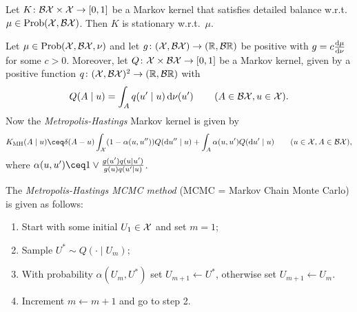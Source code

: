 \begin{lemma}
	Let $K \colon \mathcal B \mathcal X \times \mathcal X \to [0, 1]$ be a Markov kernel that satisfies detailed balance w.r.t.\ $\mu \in \operatorname{Prob}(\mathcal X, \mathcal B\mathcal X)$. Then $K$ is stationary w.r.t.\ $\mu$. 
\end{lemma}

\begin{definition}
	Let $\mu \in \operatorname{Prob}(\mathcal X, \mathcal B\mathcal X, \nu)$ and let $g \colon (\mathcal X, \mathcal B\mathcal X) \to (\mathbb R, \mathcal B\mathbb R)$ be positive with $g = c \dv{\mu}{\nu}$ for some $c > 0$. Moreover, let $Q \colon \mathcal X \times \mathcal B\mathcal X \to [0, 1]$ be a Markov kernel, given by a positive function $q \colon (\mathcal X, \mathcal B\mathcal X)^2 \to (\mathbb R, \mathcal B\mathbb R)$ with
	\[
	Q(A \mid u) = \int_A q(u' \mid u) \dd{\nu(u')} \qquad(A \in \mathcal B\mathcal X, u \in \mathcal X). 
	\]
	Now the \emph{Metropolis-Hastings} Markov kernel is given by
	\[
	K_\Rm{MH}(A \mid u) \ceq \delta(A - u) \int_\XX (1-\alpha(u, u'')) Q(\dd{u''} \mid u) + \int_A \alpha(u, u') Q(\dd{u'} \mid u) \qquad(u \in \XX, A \in \BB\XX),
	\]
	where $\alpha(u, u') \ceq 1 \lor \frac{g(u') q(u \mid u')}{g(u) q(u' \mid u)}$. 
\end{definition}

The \emph{Metropolis-Hastings MCMC method} (MCMC = Markov Chain Monte Carlo) is given as follows:
\begin{enumerate}
	\item Start with some initial $U_1 \in \mathcal X$ and set $m = 1$;
	\item Sample $U^* \sim Q(\cdot \mid U_m)$;
	\item With probability $\alpha(U_m, U^*)$ set $U_{m+1} \leftarrow U^*$, otherwise set $U_{m+1} \leftarrow U_m$. 
	\item Increment $m \leftarrow m + 1$ and go to step 2. 
\end{enumerate}

